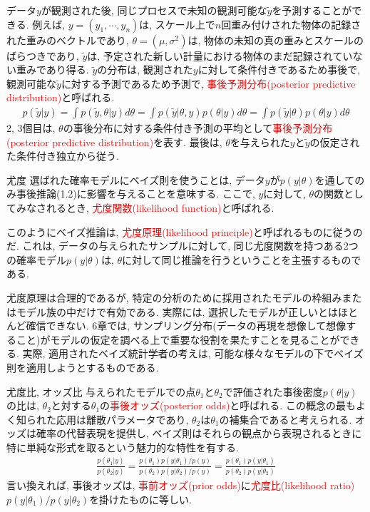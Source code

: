 \documentclass[10pt,dvipdfmx,a4]{beamer}
\newcommand{\eq}[1]{\begin{align}#1\end{align}}
\newcommand{\tcr}[1]{\textcolor{red}{#1}}
\begin{document}
\begin{frame}
データ$y$が観測された後, 同じプロセスで未知の観測可能な$\tilde{y}$を予測することができる.
例えば, $y=(y_1,\cdots, y_n)$は, スケール上で$n$回重み付けされた物体の記録された重みのベクトルであり, $\theta=(\mu,\sigma^2)$は, 物体の未知の真の重みとスケールのばらつきであり, $\tilde{y}$は, 予定された新しい計量における物体のまだ記録されていない重みであり得る.
$\tilde{y}$の分布は, 観測された$y$に対して条件付きであるため事後で, 観測可能な$\tilde{y}$に対する予測であるため予測で, \tcr{事後予測分布(posterior predictive distribution)}と呼ばれる.
\eq{p(\tilde{y}|y)=\int p(\tilde{y},\theta|y)d\theta=\int p(\tilde{y}|\theta,y)p(\theta|y)d\theta=\int p(\tilde{y}|\theta)p(\theta|y)d\theta}
2, 3個目は, $\theta$の事後分布に対する条件付き予測の平均として\tcr{事後予測分布(posterior predictive distribution)}を表す.
最後は, $\theta$を与えられた$y$と$\tilde{y}$の仮定された条件付き独立から従う.
\end{frame}


\begin{frame}{尤度}
選ばれた確率モデルにベイズ則を使うことは, データ$y$が$p(y|\theta)$を通してのみ事後推論(1.2)に影響を与えることを意味する.
ここで, $y$に対して, $\theta$の関数としてみなされるとき, \tcr{尤度関数(likelihood function)}と呼ばれる.

このようにベイズ推論は, \tcr{尤度原理(likelihood principle)}と呼ばれるものに従うのだ.
これは, データの与えられたサンプルに対して, 同じ尤度関数を持つある2つの確率モデル$p(y|\theta)$は, $\theta$に対して同じ推論を行うということを主張するものである.

尤度原理は合理的であるが, 特定の分析のために採用されたモデルの枠組みまたはモデル族の中だけで有効である.
実際には, 選択したモデルが正しいとはほとんど確信できない.
6章では, サンプリング分布(データの再現を想像して想像すること)がモデルの仮定を調べる上で重要な役割を果たすことを見ることができる.
実際, 適用されたベイズ統計学者の考えは, 可能な様々なモデルの下でベイズ則を適用しようとするものである.
\end{frame}


\begin{frame}{尤度比, オッズ比}
与えられたモデルでの点$\theta_1$と$\theta_2$で評価された事後密度$p(\theta|y)$の比は, $\theta_2$と対する$\theta_1$の\tcr{事後オッズ(posterior odds)}と呼ばれる.
この概念の最もよく知られた応用は離散パラメータであり, $\theta_2$は$\theta_1$の補集合であると考えられる.
オッズは確率の代替表現を提供し, ベイズ則はそれらの観点から表現されるときに特に単純な形式を取るという魅力的な特性を有する.
\eq{\frac{p(\theta_1|y)}{p(\theta_2|y)}=\frac{p(\theta_1)p(y|\theta_1)/p(y)}{p(\theta_2)p(y|\theta_2)/p(y)}=\frac{p(\theta_1)p(y|\theta_1)}{p(\theta_2)p(y|\theta_2)}}
言い換えれば, 事後オッズは, \tcr{事前オッズ(prior odds)}に\tcr{尤度比(likelihood ratio)}$p(y|\theta_1)/p(y|\theta_2)$を掛けたものに等しい.
\end{frame}
\end{document}
